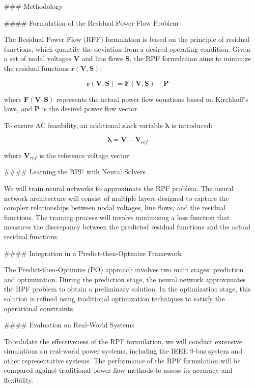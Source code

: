 ### Methodology

#### Formulation of the Residual Power Flow Problem

The Residual Power Flow (RPF) formulation is based on the principle of residual functions, which quantify the deviation from a desired operating condition. Given a set of nodal voltages \( \mathbf{V} \) and line flows \( \mathbf{S} \), the RPF formulation aims to minimize the residual functions \( \mathbf{r}(\mathbf{V}, \mathbf{S}) \):

\[ \mathbf{r}(\mathbf{V}, \mathbf{S}) = \mathbf{F}(\mathbf{V}, \mathbf{S}) - \mathbf{P} \]

where \( \mathbf{F}(\mathbf{V}, \mathbf{S}) \) represents the actual power flow equations based on Kirchhoff's laws, and \( \mathbf{P} \) is the desired power flow vector.

To ensure AC feasibility, an additional slack variable \( \mathbf{\lambda} \) is introduced:

\[ \mathbf{\lambda} = \mathbf{V} - \mathbf{V}_{ref} \]

where \( \mathbf{V}_{ref} \) is the reference voltage vector.

#### Learning the RPF with Neural Solvers

We will train neural networks to approximate the RPF problem. The neural network architecture will consist of multiple layers designed to capture the complex relationships between nodal voltages, line flows, and the residual functions. The training process will involve minimizing a loss function that measures the discrepancy between the predicted residual functions and the actual residual functions.

#### Integration in a Predict-then-Optimize Framework

The Predict-then-Optimize (PO) approach involves two main stages: prediction and optimization. During the prediction stage, the neural network approximates the RPF problem to obtain a preliminary solution. In the optimization stage, this solution is refined using traditional optimization techniques to satisfy the operational constraints.

#### Evaluation on Real-World Systems

To validate the effectiveness of the RPF formulation, we will conduct extensive simulations on real-world power systems, including the IEEE 9-bus system and other representative systems. The performance of the RPF formulation will be compared against traditional power flow methods to assess its accuracy and flexibility.

